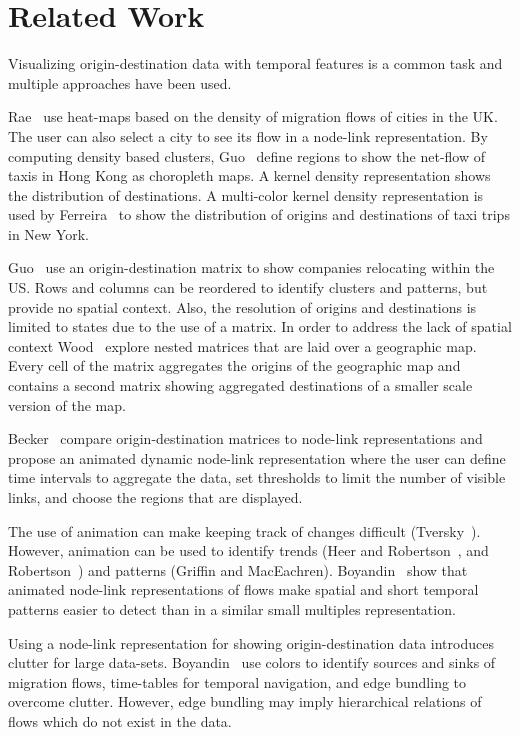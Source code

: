 \section{Related Work}
Visualizing origin-destination data with temporal features
is a common task and multiple approaches have been used.

Rae~\cite{Rae2009} use heat-maps based on
the density of migration flows of cities in the UK.
The user can also select a city to see its flow
in a node-link representation.
By computing density based clusters,
Guo~\etal\cite{Guo2012} define regions
to show the net-flow of taxis in Hong Kong
as choropleth maps.
A kernel density representation shows
the distribution of destinations.
A multi-color kernel density representation is
used by Ferreira~\etal\cite{Ferreira2013}
to show the distribution of
origins and destinations of taxi trips in New York.

Guo~\etal\cite{Guo2006} use an origin-destination matrix
to show companies relocating within the US.
Rows and columns can be reordered to identify clusters
and patterns, but provide no spatial context.
Also, the resolution of origins and destinations is limited
to states due to the use of a matrix.
In order to address the lack of spatial context
Wood~\etal\cite{Wood2002} explore nested matrices
that are laid over a geographic map.
Every cell of the matrix aggregates the origins
of the geographic map and contains
a second matrix showing aggregated destinations of
a smaller scale version of the map.

Becker~\etal\cite{Becker1995} compare
origin-destination matrices to node-link representations
and propose an animated dynamic node-link representation
where the user can define time intervals to aggregate the data,
set thresholds to limit the number of visible links,
and choose the regions that are displayed.

The use of animation can make keeping track of changes
difficult (Tversky~\etal\cite{Tversky2002}).
However, animation can be used to
identify trends (Heer and Robertson~\cite{Heer2007},
and Robertson~\etal\cite{Robertson}) and
patterns (Griffin and MacEachren\cite{Griffin2006}).
Boyandin~\etal\cite{Boyandin2012} show that animated
node-link representations of flows make spatial and
short temporal patterns easier to detect than in
a similar small multiples representation.

Using a node-link representation for showing origin-destination
data introduces clutter for large data-sets.
Boyandin~\etal\cite{Boyandin2008} use colors to identify
sources and sinks of migration flows,
time-tables for temporal navigation, and
edge bundling to overcome clutter.
However, edge bundling may imply hierarchical
relations of flows which do not exist in the data.

